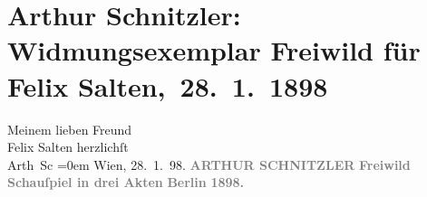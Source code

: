 

         
         \renewcommand{\erwaehntePersonen}{Personen: Felix Salten}
         \renewcommand{\erwaehnteInstitutionen}{Institutionen: S. Fischer Verlag}
         \renewcommand{\erwaehnteOrte}{Orte: Berlin, Wien}
         \renewcommand{\erwaehnteWerke}{Werke: Freiwild. Schauspiel in 3 Akten}
               \section[ Arthur Schnitzler: Widmungsexemplar Freiwild für Felix Salten, 28. 1. 1898]{ Arthur Schnitzler: Widmungsexemplar Freiwild für Felix
               Salten, 28. 1. 1898}\nopagebreak{}\rehead{ }\begin{ledgroupsized}[t]{13cm}\normalsize\beginnumbering \toendnotes[C]{\smallbreak\pagebreak[2]} 
\pstart
           \noindent{}{\pb}Meinem lieben Freund{\\} Felix Salten\pend
           \pstart
           herzlichſt{\\[\baselineskip]}\spacefill\mbox{Arth Sc}\pend
           \leftskip=0em{}\pstart
           Wien, 28. 1. 98.\pend
           {\bigskip}\pstart
           \noindent{}\centering{}\textcolor{gray}{\textbf{ARTHUR SCHNITZLER}}\pend
           {\bigskip}\pstart
           \noindent{}\centering{}\textcolor{gray}{\textbf{Freiwild}}\pend
           \pstart
           \noindent{}\centering{}\textcolor{gray}{\textbf{Schauſpiel in drei Akten}}\pend
           {\bigskip}\pstart
           \noindent{}\centering{}\textcolor{gray}{\textbf{\textbf{Berlin}}}\pend
           \pstart
           \noindent{}\centering{}\textcolor{gray}{\textbf{}}\pend
           \pstart
           \noindent{}\centering{}\textcolor{gray}{\textbf{1898.}}\pend
           
         
         \endnumbering{}\end{ledgroupsized}  \newcommand{\dateiname}{L03608}\newcommand{\titel}{Arthur Schnitzler: Widmungsexemplar Freiwild für Felix Salten, 28. 1. 1898}\newcommand{\editorInnen}{Martin Anton Müller und Laura Untner}
      